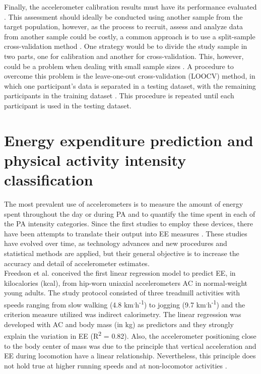 \documentclass[11pt]{article}
\begin{document}
Finally, the accelerometer calibration results must have its performance evaluated \cite{Basset_2012}. This assessment should ideally be conducted using another sample from the target population, however, as the process to recruit, assess and analyze data from another sample could be costly, a common approach is to use a split-sample cross-validation method \cite{Staudenmayer_2012}. One strategy would be to divide the study sample in two parts, one for calibration and another for cross-validation. This, however, could be a problem when dealing with small sample sizes \cite{Staudenmayer_2012}. A procedure to overcome this problem is the leave-one-out cross-validation (LOOCV) method, in which one participant's data is separated in a testing dataset, with the remaining participants in the training dataset \cite{Staudenmayer_2012}. This procedure is repeated until each participant is used in the testing dataset.

\section*{Energy expenditure prediction and physical activity intensity classification}

The most prevalent use of accelerometers is to measure the amount of energy spent throughout the day or during PA and to quantify the time spent in each of the PA intensity categories. Since the first studies to employ these devices, there have been attempts to translate their output into EE measures \cite{Wong_1981, Montoye_1983}. These studies have evolved over time, as technology advances and new procedures and statistical methods are applied, but their general objective is to increase the accuracy and detail of accelerometer estimates. \\

Freedson et al. \citeyear{Freedson_1998} conceived the first linear regression model to predict EE, in kilocalories (kcal), from hip-worn uniaxial accelerometers AC in normal-weight young adults. The study protocol consisted of three treadmill activities with speeds ranging from slow walking (4.8 km\textsuperscript{.}h\textsuperscript{-1}) to jogging (9.7 km\textsuperscript{.}h\textsuperscript{-1}) and the criterion measure utilized was indirect calorimetry. The linear regression was developed with AC and body mass (in kg) as predictors and they strongly explain the variation in EE  (R\textsuperscript{2} = 0.82). Also, the accelerometer positioning close to the body center of mass was due to the principle that vertical acceleration and EE during locomotion have a linear relationship. Nevertheless, this principle does not hold true at higher running speeds and at non-locomotor activities \cite{Lyden_2012}. \\
\end{document}
